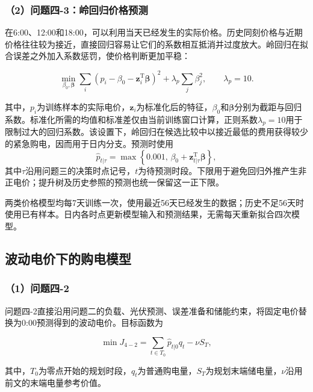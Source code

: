 \subsubsection*{（2）问题四-3：岭回归价格预测}

在6:00、12:00和18:00，可以利用当天已经发生的实际价格。历史同刻价格与近期价格往往较为接近，直接回归容易让它们的系数相互抵消并过度放大。岭回归在拟合误差之外加入系数惩罚\cite{hoerl}，使价格判断更加平稳：

\begin{equation}
\min_{\beta_0,\boldsymbol{\beta}}
\sum_i
\left(
p_i-\beta_0-\mathbf{z}_i^{\mathrm T}\boldsymbol{\beta}
\right)^2
+
\lambda_p
\sum_j\beta_j^2,
\qquad
\lambda_p=10.
\end{equation}

其中，$p_i$为训练样本的实际电价，$\mathbf{z}_i$为标准化后的特征，$\beta_0$和$\boldsymbol{\beta}$分别为截距与回归系数。标准化所需的均值和标准差仅由当前训练窗口计算，正则系数$\lambda_p=10$用于限制过大的回归系数。该设置下，岭回归在候选比较中以接近最低的费用获得较少的紧急购电，因而用于日内分支。预测时使用
\begin{equation}
\hat p_{t|\tau}=\max\left\{0.001,\,\beta_0+\mathbf{z}_{t|\tau}^{\mathrm T}\boldsymbol{\beta}\right\},
\end{equation}
其中$\tau$沿用问题三的决策时点记号，$t$为待预测时段。下限用于避免回归外推产生非正电价；提升树及历史参照的预测也统一保留这一正下限。

两类价格模型均每7天训练一次，使用最近56天已经发生的数据；历史不足56天时使用已有样本。日内各时点更新模型输入和预测结果，无需每天重新拟合四次模型。

\subsection{波动电价下的购电模型}

\subsubsection*{（1）问题四-2}

问题四-2直接沿用问题二的负载、光伏预测、误差准备和储能约束，将固定电价替换为0:00预测得到的波动电价。目标函数为

\begin{equation}
\min J_{4-2}
=
\sum_{t\in T_0}
\hat{p}_{t|0}q_t
-
\nu S_T,
\end{equation}

其中，$T_0$为零点开始的规划时段，$q_t$为普通购电量，$S_T$为规划末端储电量，$\nu$沿用前文的末端电量参考价值。

